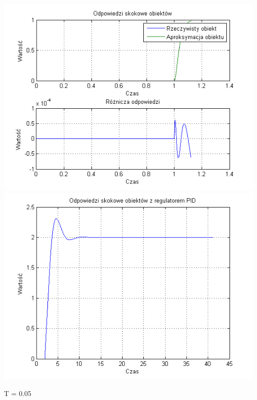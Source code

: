 \documentclass[10pt,a4paper]{article}
\begin{document}
\begin{center}
\includegraphics[scale=1]{images/dwa/skrypt_45.png}\\
\includegraphics[scale=1]{images/dwa/skrypt_46.png}\\
\end{center}
\newpage
T = 0.05
\end{document}
